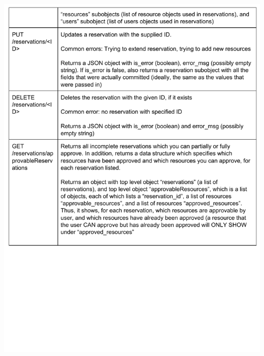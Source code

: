 \documentclass[12pt]{article}
\begin{document}
\includegraphics[width=6in]{apispec_03.pdf}
\end{document}
